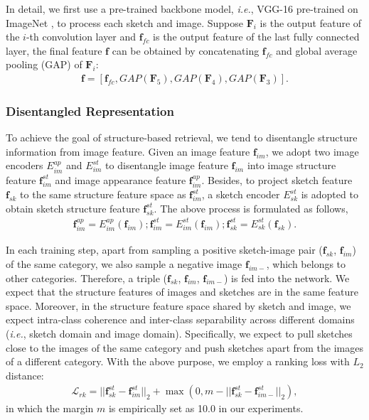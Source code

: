 \documentclass[10pt,twocolumn,letterpaper]{article}
\begin{document}
In detail, we first use a pre-trained backbone model, \emph{i.e.}, VGG-16 pre-trained on ImageNet \cite{deng2009imagenet}, to process each sketch and image. 
Suppose $\mathbf{F}_i$ is the output feature of the $i$-th convolution layer and $\mathbf{f}_{fc}$ is the output feature of the last fully connected layer, the final feature $\mathbf{f}$ can be obtained by concatenating $\mathbf{f}_{fc}$ and global average pooling (GAP) of $\mathbf{F}_i$:
\vspace{-10pt}
\begin{align}
\mathbf{f}\!=\![\mathbf{f}_{fc}, GAP(\mathbf{F}_5), GAP(\mathbf{F}_4), GAP(\mathbf{F}_3)].
\end{align}

\subsubsection{Disentangled Representation}
To achieve the goal of structure-based retrieval, we tend to disentangle structure information from image feature. 
Given an image feature $\mathbf{f}_{im}$, we adopt two image encoders $E_{im}^{ap}$ and $E_{im}^{st}$ to disentangle image feature $\mathbf{f}_{im}$ into image structure feature $\mathbf{f}_{im}^{st}$ and image appearance feature $\mathbf{f}_{im}^{ap}$. Besides, to project sketch feature $\mathbf{f}_{sk}$ to the same structure feature space as $\mathbf{f}_{im}^{st}$, a sketch encoder $E_{sk}^{st}$ is adopted to obtain sketch structure feature $\mathbf{f}_{sk}^{st}$. The above process is formulated as follows,
\vspace{-5pt}
\begin{align}
    \mathbf{f}_{im}^{ap} \!=\! E_{im}^{ap}(\mathbf{f}_{im}); \mathbf{f}_{im}^{st} \!=\! E_{im}^{st}(\mathbf{f}_{im}); \mathbf{f}_{sk}^{st} \!=\! E_{sk}^{st}(\mathbf{f}_{sk}).
\end{align}

In each training step, apart from sampling a positive sketch-image pair ($\mathbf{f}_{sk}$, $\mathbf{f}_{im}$) of the same category, we also sample a negative image $\mathbf{f}_{im-}$, which belongs to other categories. Therefore, a triple ($\mathbf{f}_{sk}$, $\mathbf{f}_{im}$, $\mathbf{f}_{im-}$) is fed into the network. We expect that the structure features of images and sketches are in the same feature space. Moreover, in the structure feature space shared by sketch and image, we expect intra-class coherence and inter-class separability across different domains (\emph{i.e.}, sketch domain and image domain). Specifically, we expect to pull sketches close to the images of the same category and push sketches apart from the images of a different category. With the above purpose, we employ a ranking loss with $L_2$ distance:
\vspace{-5pt}
\begin{align} \label{eqn:rank_loss}
        \mathcal{L}_{rk} \!=\! ||\mathbf{f}_{sk}^{st}\!-\!\mathbf{f}_{im}^{st}||_{2}\!+\!\max(0,\!m\!-\!||\mathbf{f}_{sk}^{st}\!-\!\mathbf{f}_{im-}^{st}||_{2}),
\end{align}
in which the margin $m$ is empirically set as 10.0 in our experiments.
\end{document}
